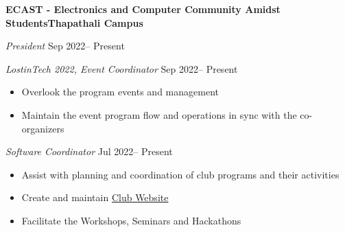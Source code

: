 \textbf{ECAST - Electronics and Computer Community Amidst Students\hfill Thapathali Campus}\par

\textit{President} \hfill Sep 2022-- Present

\textit{LostinTech 2022, Event Coordinator} \hfill Sep 2022-- Present
\begin{itemize}
	\item Overlook the program events and management
	\item Maintain the event program flow and operations in sync with the co-organizers
\end{itemize}\par

\textit{Software Coordinator} \hfill Jul 2022-- Present
\begin{itemize}
	\item Assist with planning and coordination of club programs and their activities
	\item Create and maintain \href{https://www.ecast.tech/}{Club Website}
	\item Facilitate the Workshops, Seminars and Hackathons
\end{itemize}\par